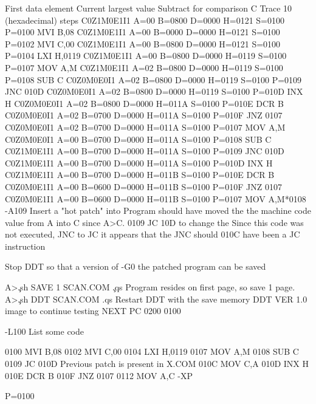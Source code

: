                             First data element
                                   Current largest value
                                          Subtract for comparison C
    Trace 10 (hexadecimal) steps
C0Z1M0E1I1 A=00 B=0800 D=0000 H=0121 S=0100 P=0100 MVI B,08
C0Z1M0E1I1 A=00 B=0000 D=0000 H=0121 S=0100 P=0102 MVI C,00
C0Z1M0E1I1 A=00 B=0800 D=0000 H=0121 S=0100 P=0104 LXI H,0119
C0Z1M0E1I1 A=00 B=0800 D=0000 H=0119 S=0100 P=0107 MOV A,M
C0Z1M0E1I1 A=02 B=0800 D=0000 H=0119 S=0100 P=0108 SUB C
C0Z0M0E0I1 A=02 B=0800 D=0000 H=0119 S=0100 P=0109 JNC 010D
C0Z0M0E0I1 A=02 B=0800 D=0000 H=0119 S=0100 P=010D INX H
C0Z0M0E0I1 A=02 B=0800 D=0000 H=011A S=0100 P=010E DCR B
C0Z0M0E0I1 A=02 B=0700 D=0000 H=011A S=0100 P=010F JNZ 0107
C0Z0M0E0I1 A=02 B=0700 D=0000 H=011A S=0100 P=0107 MOV A,M
C0Z0M0E0I1 A=00 B=0700 D=0000 H=011A S=0100 P=0108 SUB C
C0Z1M0E1I1 A=00 B=0700 D=0000 H=011A S=0100 P=0109 JNC 010D
C0Z1M0E1I1 A=00 B=0700 D=0000 H=011A S=0100 P=010D INX H
C0Z1M0E1I1 A=00 B=0700 D=0000 H=011B S=0100 P=010E DCR B
C0Z0M0E1I1 A=00 B=0600 D=0000 H=011B S=0100 P=010F JNZ 0107
C0Z0M0E1I1 A=00 B=0600 D=0000 H=011B S=0100 P=0107 MOV A,M*0108
-A109
             Insert a "hot patch" into    Program should have moved the
             the machine code             value from A into C since A>C.
0109 JC 10D  to change the                Since this code was not executed,
             JNC to JC                    it appears that the JNC should
010C                                      have been a JC instruction

       Stop DDT so that a version of
-G0    the patched program can be saved

A>\c
.sh
SAVE 1 SCAN.COM  \c
.qs
Program resides on first
                   page, so save 1 page.
A>\c
.sh
DDT SCAN.COM
.qs
                   Restart DDT with the save memory
DDT VER 1.0        image to continue testing
NEXT PC
0200 0100

-L100    List some code

 0100    MVI B,08
 0102    MVI C,00
 0104    LXI H,0119
 0107    MOV A,M
 0108    SUB C
 0109    JC  010D    Previous patch is present in X.COM
 010C    MOV C,A
 010D    INX H
 010E    DCR B
 010F    JNZ 0107
 0112    MOV A,C
 -XP

P=0100

